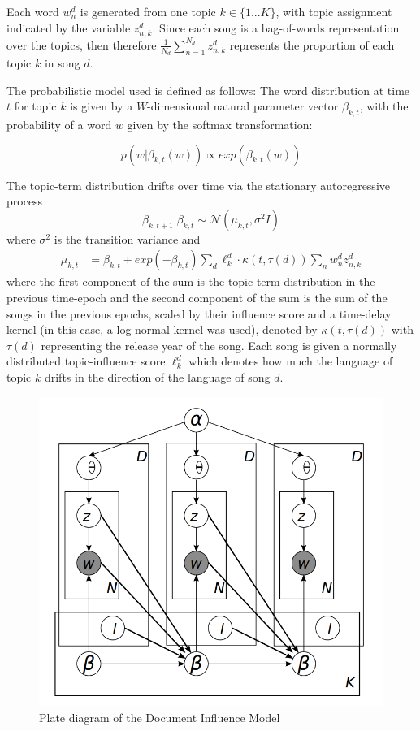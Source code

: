 Each word $w_n^d$ is generated from one topic $k \in \{1...K\}$, with topic assignment indicated by the variable $z_{n,k}^d$. Since each song is a bag-of-words representation over the topics, then therefore $\frac{1}{N_d} \sum_{n=1}^{N_d} z_{n,k}^d$ represents the proportion of each topic $k$ in song $d$.

The probabilistic model used is defined as follows:
The word distribution at time $t$ for topic $k$ is given by a $W$-dimensional natural parameter vector $\beta_{k, t}$, with the probability of a word $w$ given by the softmax transformation:

$$p(w|\beta_{k, t}(w)) \propto exp(\beta_{k, t}(w))$$

The topic-term distribution drifts over time via the stationary autoregressive process
$$\beta_{k, t+1}|\beta_{k, t} \sim \mathcal{N}(\mu_{k,t}, \sigma^2I)$$
where $\sigma^2$ is the transition variance and
\begin{align*}
    \mu_{k,t} &= \beta_{k,t} + exp(-\beta_{k,t})\sum_{d} \ell_k^d \cdot \kappa(t, \tau(d))\sum_n w_n^d z_{n,k}^d
\end{align*}
where the first component of the sum is the topic-term distribution in the previous time-epoch and the second component of the sum is the sum of the songs in the previous epochs, scaled by their influence score and a time-delay kernel (in this case, a log-normal kernel was used), denoted by $\kappa(t, \tau(d))$ with $\tau(d)$ representing the release year of the song. Each song is given a normally distributed topic-influence score $\ell_k^d$ which denotes how much the language of topic $k$ drifts in the direction of the language of song $d$.

\begin{figure}[H]
\includegraphics[width=\textwidth]{figures/dim_plate.png}
\caption{Plate diagram of the Document Influence Model}
\end{figure}

